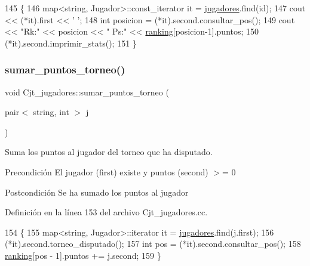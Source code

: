 \begin{DoxyCode}
145 \{
146   map<string, Jugador>::const\_iterator it = \hyperlink{class_cjt__jugadores_ae3fc5f98e0f343b039bd7dff0e616ecc}{jugadores}.find(\textcolor{keywordtype}{id});
147   cout << (*it).first << \textcolor{charliteral}{' '};
148   \textcolor{keywordtype}{int} posicion = (*it).second.consultar\_pos();
149   cout << \textcolor{stringliteral}{"Rk:"} << posicion << \textcolor{stringliteral}{" Ps:"} << \hyperlink{class_cjt__jugadores_a2a64dd6a0c9315af038dfdb4c27da059}{ranking}[posicion-1].puntos;
150   (*it).second.imprimir\_stats();
151 \}
\end{DoxyCode}
\mbox{\label{class_cjt__jugadores_adaead4375a0c4e8cb02782988423e1d8}} 
\subsubsection{\texorpdfstring{sumar\+\_\+puntos\+\_\+torneo()}{sumar\_puntos\_torneo()}}
{\footnotesize\ttfamily void Cjt\+\_\+jugadores\+::sumar\+\_\+puntos\+\_\+torneo (\begin{DoxyParamCaption}\item[{pair$<$ string, int $>$}]{j }\end{DoxyParamCaption})}



Suma los puntos al jugador del torneo que ha disputado. 

\begin{DoxyPrecond}{Precondición}
El jugador (first) existe y puntos (second) $>$= 0 
\end{DoxyPrecond}
\begin{DoxyPostcond}{Postcondición}
Se ha sumado los puntos al jugador 
\end{DoxyPostcond}


Definición en la línea 153 del archivo Cjt\+\_\+jugadores.\+cc.


\begin{DoxyCode}
154 \{
155   map<string, Jugador>::iterator it = \hyperlink{class_cjt__jugadores_ae3fc5f98e0f343b039bd7dff0e616ecc}{jugadores}.find(j.first);
156   (*it).second.torneo\_disputado();
157   \textcolor{keywordtype}{int} pos = (*it).second.consultar\_pos();
158   \hyperlink{class_cjt__jugadores_a2a64dd6a0c9315af038dfdb4c27da059}{ranking}[pos - 1].puntos += j.second;
159 \}
\end{DoxyCode}


